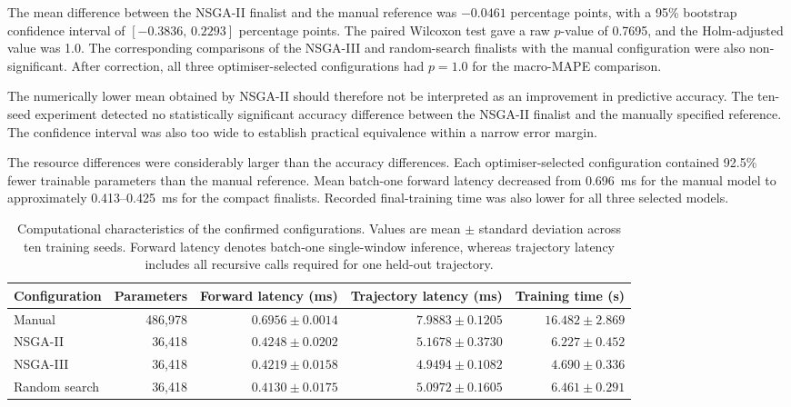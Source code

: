 \documentclass[a4paper,fleqn]{cas-sc}
\begin{document}
The mean difference between the NSGA-II finalist and the manual reference was $-0.0461$ percentage points, with a 95\% bootstrap confidence interval of $[-0.3836,\,0.2293]$ percentage points. The paired Wilcoxon test gave a raw $p$-value of 0.7695, and the Holm-adjusted value was 1.0. The corresponding comparisons of the NSGA-III and random-search finalists with the manual configuration were also non-significant. After correction, all three optimiser-selected configurations had $p=1.0$ for the macro-MAPE comparison.

The numerically lower mean obtained by NSGA-II should therefore not be interpreted as an improvement in predictive accuracy. The ten-seed experiment detected no statistically significant accuracy difference between the NSGA-II finalist and the manually specified reference. The confidence interval was also too wide to establish practical equivalence within a narrow error margin.

The resource differences were considerably larger than the accuracy differences. Each optimiser-selected configuration contained 92.5\% fewer trainable parameters than the manual reference. Mean batch-one forward latency decreased from 0.696~ms for the manual model to approximately 0.413--0.425~ms for the compact finalists. Recorded final-training time was also lower for all three selected models.

\begin{table}[htbp]
\centering
\caption{Computational characteristics of the confirmed configurations.
Values are mean $\pm$ standard deviation across ten training seeds. Forward
latency denotes batch-one single-window inference, whereas trajectory latency
includes all recursive calls required for one held-out trajectory.}
\label{tab:final_compute}
\small
\begin{tabular}{lrrrr}
\toprule
\textbf{Configuration} &
\textbf{Parameters} &
\textbf{Forward latency (ms)} &
\textbf{Trajectory latency (ms)} &
\textbf{Training time (s)} \\
\midrule
Manual &
486,978 &
$0.6956 \pm 0.0014$ &
$7.9883 \pm 0.1205$ &
$16.482 \pm 2.869$ \\

NSGA-II &
36,418 &
$0.4248 \pm 0.0202$ &
$5.1678 \pm 0.3730$ &
$6.227 \pm 0.452$ \\

NSGA-III &
36,418 &
$0.4219 \pm 0.0158$ &
$4.9494 \pm 0.1082$ &
$4.690 \pm 0.336$ \\

Random search &
36,418 &
$0.4130 \pm 0.0175$ &
$5.0972 \pm 0.1605$ &
$6.461 \pm 0.291$ \\
\bottomrule
\end{tabular}
\end{table}
\end{document}
